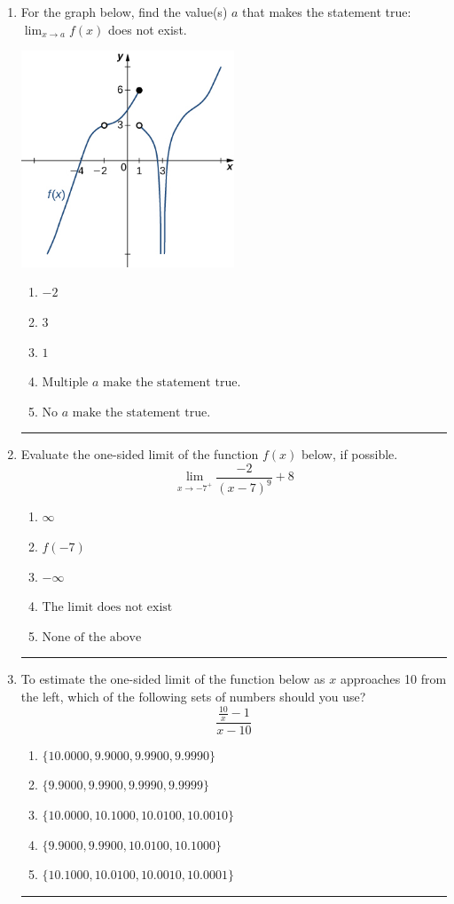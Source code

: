 \documentclass[14pt]{extbook}
\newcommand{\litem}[1]{\item#1\hspace*{-1cm}\rule{\textwidth}{0.4pt}}
\begin{document}
\begin{enumerate}
{\begin{enumerate}[label=\Alph*.]
\end{enumerate} }
\litem{
For the graph below, find the value(s) $a$ that makes the statement true: $ \displaystyle \lim_{x \rightarrow a} f(x)$ does not exist.
\begin{center}
    \includegraphics[width=0.5\textwidth]{../Figures/evaluateLimitGraphicallyC.png}
\end{center}
\begin{enumerate}[label=\Alph*.]
\item \( -2 \)
\item \( 3 \)
\item \( 1 \)
\item \( \text{Multiple } a \text{ make the statement true}. \)
\item \( \text{No } a \text{ make the statement true}. \)

\end{enumerate} }
\litem{
Evaluate the one-sided limit of the function $f(x)$ below, if possible.\[ \lim_{x \rightarrow -7^+} \frac{-2}{(x-7)^9}+8 \]\begin{enumerate}[label=\Alph*.]
\item \( \infty \)
\item \( f(-7) \)
\item \( -\infty \)
\item \( \text{The limit does not exist} \)
\item \( \text{None of the above} \)

\end{enumerate} }
\litem{
To estimate the one-sided limit of the function below as $x$ approaches 10 from the left, which of the following sets of numbers should you use?\[ \frac{\frac{10}{x} - 1}{x - 10} \]\begin{enumerate}[label=\Alph*.]
\item \( \{ 10.0000, 9.9000, 9.9900, 9.9990 \} \)
\item \( \{ 9.9000, 9.9900, 9.9990, 9.9999 \} \)
\item \( \{ 10.0000, 10.1000, 10.0100, 10.0010 \} \)
\item \( \{ 9.9000, 9.9900, 10.0100, 10.1000 \} \)
\item \( \{ 10.1000, 10.0100, 10.0010, 10.0001 \} \)


\end{enumerate}}
\end{enumerate}
\end{document}
